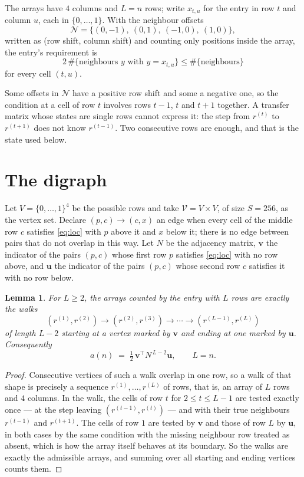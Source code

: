 \documentclass[11pt,a4paper]{article}
\theoremstyle{plain}
\newtheorem{lemma}[theorem]{Lemma}
\theoremstyle{definition}
\begin{document}
The arrays have $4$ columns and $L=n$ rows; write $x_{t,u}$ for the entry in
row $t$ and column $u$, each in $\{0,\dots,1\}$. With the neighbour offsets
\[
\mathcal N=\{(0,-1),\ (0,1),\ (-1,0),\ (1,0)\},
\]
written as (row shift, column shift) and counting only positions inside the array, the
entry's requirement is
\begin{equation}\label{eq:loc}
2\,\#\{\text{neighbours }y\text{ with }y=x_{t,u}\}\le\#\{\text{neighbours}\}
\end{equation}
for every cell $(t,u)$.

Some offsets in $\mathcal N$ have a positive row shift and some a negative one, so the
condition at a cell of row $t$ involves rows $t-1$, $t$ and $t+1$ together. A transfer
matrix whose states are single rows cannot express it: the step from $r^{(t)}$ to
$r^{(t+1)}$ does not know $r^{(t-1)}$. Two consecutive rows are enough, and that is
the state used below.

\section{The digraph}

Let $V=\{0,\dots,1\}^{4}$ be the possible rows and take
$\mathcal V=V\times V$, of size $S=256$, as the vertex set. Declare $(p,c)\to(c,x)$ an edge
when every cell of the middle row $c$ satisfies \eqref{eq:loc} with $p$ above it and $x$
below it; there is no edge between pairs that do not overlap in this way. Let $N$ be the
adjacency matrix, $\mathbf{v}$ the indicator of the pairs $(p,c)$ whose first row $p$
satisfies \eqref{eq:loc} with no row above, and $\mathbf{u}$ the indicator of
the pairs $(p,c)$ whose second row $c$ satisfies it with no row below.

\begin{lemma}\label{lem:walk}
For $L\ge2$, the arrays counted by the entry with $L$ rows are exactly the walks
\[
(r^{(1)},r^{(2)})\to(r^{(2)},r^{(3)})\to\cdots\to(r^{(L-1)},r^{(L)})
\]
of length $L-2$ starting at a vertex marked by $\mathbf{v}$ and ending at one marked by
$\mathbf{u}$. Consequently
\[
a(n)\;=\;\tfrac1{2}\,\mathbf{v}^{\!\top}N^{\,L-2}\mathbf{u},\qquad L=n .
\]
\end{lemma}

\begin{proof}
Consecutive vertices of such a walk overlap in one row, so a walk of that shape is
precisely a sequence $r^{(1)},\dots,r^{(L)}$ of rows, that is, an array of $L$ rows
and $4$ columns. In the walk, the cells of row $t$ for $2\le t\le L-1$ are tested
exactly once --- at the step leaving $(r^{(t-1)},r^{(t)})$ --- and with their true
neighbours $r^{(t-1)}$ and $r^{(t+1)}$. The cells of row $1$ are tested by
$\mathbf{v}$ and those of row $L$ by $\mathbf{u}$, in both cases by the same condition
with the missing neighbour row treated as absent, which is how the array itself behaves at
its boundary. So the walks are exactly the admissible arrays, and summing over all starting
and ending vertices counts them.
\end{proof}
\end{document}
